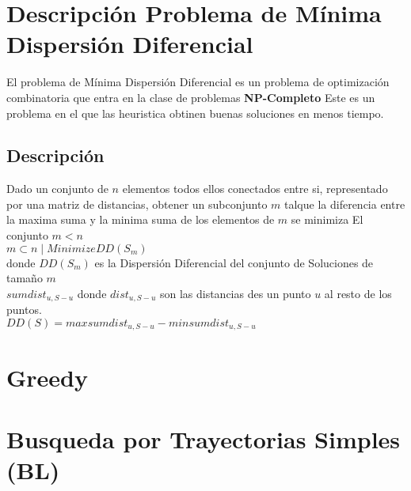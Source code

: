 \section{Descripción Problema de Mínima Dispersión Diferencial}
El problema de Mínima Dispersión Diferencial es un problema de optimización combinatoria que entra en la clase de problemas
\textbf{NP-Completo}
Este es un problema en el que las heuristica obtinen buenas soluciones en menos tiempo.

\subsection{Descripción}
Dado un conjunto de $n$ elementos todos ellos conectados entre si, representado por una matriz de distancias, obtener
un subconjunto $m$ talque la diferencia entre la maxima suma y la minima suma de los elementos de $m$
se minimiza
El conjunto $m < n$\\
$ m \subset n \mid Minimize DD(S_m) $\\
donde $DD(S_m) $ es la Dispersión Diferencial del conjunto de Soluciones de tamaño $m$\\
$sum dist_{u,S-u}$  donde $dist_{u,S-u}$ son las distancias des un punto $u$ al resto de los puntos.\\

$DD(S) = max{sum dist_{u,S-u}} - min{sum dist_{u,S-u}}$
\section{Greedy}

\section{Busqueda por Trayectorias Simples (BL)}









